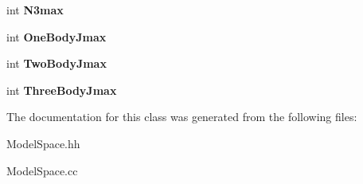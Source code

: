 \begin{DoxyCompactItemize}
\item 
\hypertarget{classModelSpace_ab28d5ba1838ef9d91a3f7c570530ca7c}{int {\bfseries N3max}}\label{classModelSpace_ab28d5ba1838ef9d91a3f7c570530ca7c}

\item 
\hypertarget{classModelSpace_a4c8f0a4476a3b3da3fced59d899f0134}{int {\bfseries One\-Body\-Jmax}}\label{classModelSpace_a4c8f0a4476a3b3da3fced59d899f0134}

\item 
\hypertarget{classModelSpace_aa2fd94965eb8a508e5ea7d4c879bae0b}{int {\bfseries Two\-Body\-Jmax}}\label{classModelSpace_aa2fd94965eb8a508e5ea7d4c879bae0b}

\item 
\hypertarget{classModelSpace_af9ca130d96f582d0ed1a4ef5373bcd05}{int {\bfseries Three\-Body\-Jmax}}\label{classModelSpace_af9ca130d96f582d0ed1a4ef5373bcd05}

\end{DoxyCompactItemize}


The documentation for this class was generated from the following files\-:\begin{DoxyCompactItemize}
\item 
Model\-Space.\-hh\item 
Model\-Space.\-cc\end{DoxyCompactItemize}
